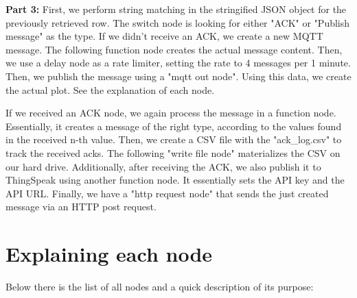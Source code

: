 \documentclass{article}
\begin{document}
\textbf{Part 3:} 
First, we perform string matching in the stringified JSON object for the previously retrieved row. The switch node is looking for either "ACK" or "Publish message" as the type. If we didn't receive an ACK, we create a new MQTT message. The following function node creates the actual message content. Then, we use a delay node as a rate limiter, setting the rate to 4 messages per 1 minute. Then, we publish the message using a "mqtt out node". Using this data, we create the actual plot. See the explanation of each node.

If we received an ACK node, we again process the message in a function node. Essentially, it creates a message of the right type, according to the values found in the received n-th value. Then, we create a CSV file with the "ack\_log.csv" to track the received acks. The following "write file node" materializes the CSV on our hard drive. Additionally, after receiving the ACK, we also publish it to ThingSpeak using another function node. It essentially sets the API key and the API URL. Finally, we have a "http request node" that sends the just created message via an HTTP post request.

\section{Explaining each node}

Below there is the list of all nodes and a quick description of its purpose:
\end{document}
